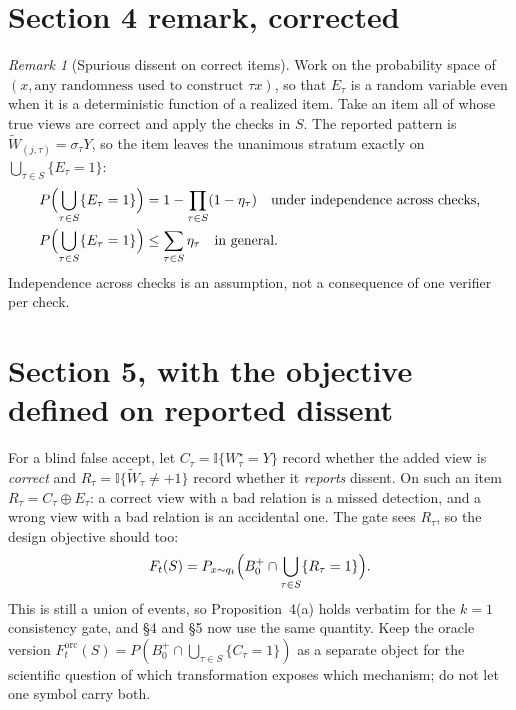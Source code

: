 \documentclass[11pt]{article}
\theoremstyle{remark}
\newtheorem*{remark}{Remark}
\newcommand{\Wt}{\widetilde{W}}
\begin{document}
\section*{Section 4 remark, corrected}

\begin{remark}[Spurious dissent on correct items]
Work on the probability space of $(x,\text{any randomness used to construct }\tau x)$, so that $E_\tau$ is a random variable even when it is a deterministic function of a realized item. Take an item all of whose true views are correct and apply the checks in $S$. The reported pattern is $\Wt_{(j,\tau)}=\sigma_\tau Y$, so the item leaves the unanimous stratum exactly on $\bigcup_{\tau\in S}\{E_\tau=1\}$:
\begin{align*}
P\Bigl(\bigcup_{\tau\in S}\{E_\tau=1\}\Bigr)&=1-\prod_{\tau\in S}(1-\eta_\tau)\quad\text{under independence across checks,}\\
P\Bigl(\bigcup_{\tau\in S}\{E_\tau=1\}\Bigr)&\le\sum_{\tau\in S}\eta_\tau\quad\text{in general.}
\end{align*}
Independence across checks is an assumption, not a consequence of one verifier per check.
\end{remark}

\section*{Section 5, with the objective defined on reported dissent}

For a blind false accept, let $C_\tau=\mathbb{I}\{W^\star_\tau=Y\}$ record whether the added view is \emph{correct} and $R_\tau=\mathbb{I}\{\Wt_\tau\neq+1\}$ record whether it \emph{reports} dissent. On such an item $R_\tau=C_\tau\oplus E_\tau$: a correct view with a bad relation is a missed detection, and a wrong view with a bad relation is an accidental one. The gate sees $R_\tau$, so the design objective should too:
\[
F_t(S)=P_{x\sim q_t}\Bigl(B_0^+\cap\bigcup_{\tau\in S}\{R_\tau=1\}\Bigr).
\]
This is still a union of events, so Proposition~4(a) holds verbatim for the $k=1$ consistency gate, and \S4 and \S5 now use the same quantity. Keep the oracle version $F^{\mathrm{orc}}_t(S)=P(B_0^+\cap\bigcup_{\tau\in S}\{C_\tau=1\})$ as a separate object for the scientific question of which transformation exposes which mechanism; do not let one symbol carry both.
\end{document}
